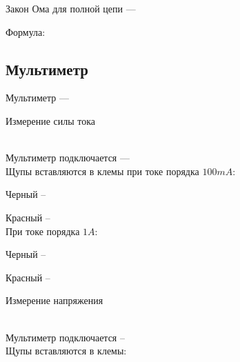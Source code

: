 Закон Ома для полной цепи --- \hrulefill

\hrulefill

\hrulefill

Формула:

%


\subsection{Мультиметр}
Мультиметр --- \hrulefill 

\hrulefill 

\hrulefill 

Измерение силы тока

\\
Мультиметр подключается --- \hrulefill
\\
Щупы вставляются в клемы при токе порядка $100 mA$:

Черный -- \hrulefill

Красный -- \hrulefill
\\
При токе порядка $1 A$:

Черный -- \hrulefill

Красный -- \hrulefill

Измерение напряжения

\\
Мультиметр подключается -- \hrulefill
\\
Щупы вставляются в клемы:

